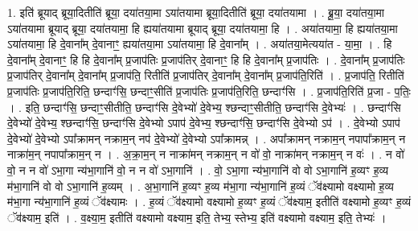 \documentclass[17pt]{extarticle}
\begin{document}
1. इति॑ ब्रूयाद् ब्रूया॒दितीति॑ ब्रूया॒ दया॑तया॒मा ऽया॑तयामा ब्रूया॒दितीति॑ ब्रूया॒ दया॑तयामा । . ब्रू॒या॒ दया॑तया॒मा ऽया॑तयामा ब्रूयाद् ब्रूया॒ दया॑तयामा॒ हि ह्यया॑तयामा ब्रूयाद् ब्रूया॒ दया॑तयामा॒ हि । . अया॑तयामा॒ हि ह्यया॑तया॒मा ऽया॑तयामा॒ हि दे॒वाना᳚म् दे॒वानाꣳ॒॒ ह्यया॑तया॒मा ऽया॑तयामा॒ हि दे॒वाना᳚म् । . अया॑तया॒मेत्यया॑त - या॒मा॒ । . हि दे॒वाना᳚म् दे॒वानाꣳ॒॒ हि हि दे॒वाना᳚म् प्र॒जाप॑तिः प्र॒जाप॑तिर् दे॒वानाꣳ॒॒ हि हि दे॒वाना᳚म् प्र॒जाप॑तिः । . दे॒वाना᳚म् प्र॒जाप॑तिः प्र॒जाप॑तिर् दे॒वाना᳚म् दे॒वाना᳚म् प्र॒जाप॑ति॒ रितीति॑ प्र॒जाप॑तिर् दे॒वाना᳚म् दे॒वाना᳚म् प्र॒जाप॑ति॒रिति॑ । . प्र॒जाप॑ति॒ रितीति॑ प्र॒जाप॑तिः प्र॒जाप॑ति॒रिति॒ छन्दाꣳ॑सि॒ छन्दाꣳ॒॒सीति॑ प्र॒जाप॑तिः प्र॒जाप॑ति॒रिति॒ छन्दाꣳ॑सि । . प्र॒जाप॑ति॒रिति॑ प्र॒जा - प॒तिः॒ । . इति॒ छन्दाꣳ॑सि॒ छन्दाꣳ॒॒सीतीति॒ छन्दाꣳ॑सि दे॒वेभ्यो॑ दे॒वेभ्य॒ श्छन्दाꣳ॒॒सीतीति॒ छन्दाꣳ॑सि दे॒वेभ्यः॑ । . छन्दाꣳ॑सि दे॒वेभ्यो॑ दे॒वेभ्य॒ श्छन्दाꣳ॑सि॒ छन्दाꣳ॑सि दे॒वेभ्यो ऽपाप॑ दे॒वेभ्य॒ श्छन्दाꣳ॑सि॒ छन्दाꣳ॑सि दे॒वेभ्यो ऽप॑ । . दे॒वेभ्यो ऽपाप॑ दे॒वेभ्यो॑ दे॒वेभ्यो ऽपा᳚क्रामन् नक्राम॒न् नप॑ दे॒वेभ्यो॑ दे॒वेभ्यो ऽपा᳚क्रामन्न् । . अपा᳚क्रामन् नक्राम॒न् नपापा᳚क्राम॒न् न नाक्रा॑म॒न् नपापा᳚क्राम॒न् न । . अ॒क्रा॒म॒न् न नाक्रा॑मन् नक्राम॒न् न वो॑ वो॒ नाक्रा॑मन् नक्राम॒न् न वः॑ । . न वो॑ वो॒ न न वो॑ ऽभा॒गा न्य॑भा॒गानि॑ वो॒ न न वो॑ ऽभा॒गानि॑ । . वो॒ ऽभा॒गा न्य॑भा॒गानि॑ वो वो ऽभा॒गानि॑ ह॒व्यꣳ ह॒व्य म॑भा॒गानि॑ वो वो ऽभा॒गानि॑ ह॒व्यम् । . अ॒भा॒गानि॑ ह॒व्यꣳ ह॒व्य म॑भा॒गा न्य॑भा॒गानि॑ ह॒व्यं ॅव॑क्ष्यामो वक्ष्यामो ह॒व्य म॑भा॒गा न्य॑भा॒गानि॑ ह॒व्यं ॅव॑क्ष्यामः । . ह॒व्यं ॅव॑क्ष्यामो वक्ष्यामो ह॒व्यꣳ ह॒व्यं ॅव॑क्ष्याम॒ इतीति॑ वक्ष्यामो ह॒व्यꣳ ह॒व्यं ॅव॑क्ष्याम॒ इति॑ । . व॒क्ष्या॒म॒ इतीति॑ वक्ष्यामो वक्ष्याम॒ इति॒ तेभ्य॒ स्तेभ्य॒ इति॑ वक्ष्यामो वक्ष्याम॒ इति॒ तेभ्यः॑ । \newline
\end{document}
